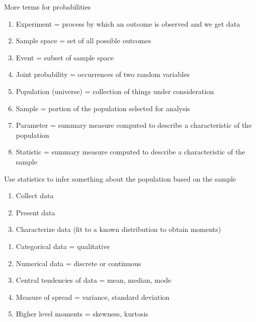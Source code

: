 \documentclass[aspectratio=1610,pdftex,dvipsnames,compress,xcolor={dvipsnames}]{beamer}
\begin{document}
\begin{frame}{More terms for probabilities}
    \begin{enumerate}[series=outerlist,topsep=0pt,itemsep=11pt,leftmargin=*,label=(\arabic*)]
        \item[]Experiment = process by which an outcome is observed and we get data
        \item[]Sample space = set of all possible outcomes
        \item[]Event = subset of sample space
        \item[]Joint probability = occurrences of two random variables
        \item[]Population (universe) = collection of things under consideration
        \item[]Sample = portion of the population selected for analysis  
        \item[]Parameter = summary measure computed to describe a characteristic of the population
        \item[]Statistic = summary measure computed to describe a characteristic of the sample
    \end{enumerate}
\end{frame}


\begin{frame}{Use statistics to infer something about the population based on the sample}
    \begin{enumerate}[series=outerlist,topsep=0pt,itemsep=7pt,leftmargin=*,label=(\arabic*)]
        \item Collect data
        \item Present data
        \item Characterize data (fit to a known distribution to obtain moments)
    \end{enumerate}

    \vspace{0.25in}

    \begin{enumerate}[series=outerlist,topsep=0pt,itemsep=7pt,leftmargin=*,label=(\arabic*)]
        \item[]Categorical data = qualitative  
        \item[]Numerical data = discrete or continuous  
        \item[]Central tendencies of data = mean, median, mode  
        \item[]Measure of spread = variance, standard deviation  
        \item[]Higher level moments = skewness, kurtosis  
    \end{enumerate}
\end{frame}
\end{document}
